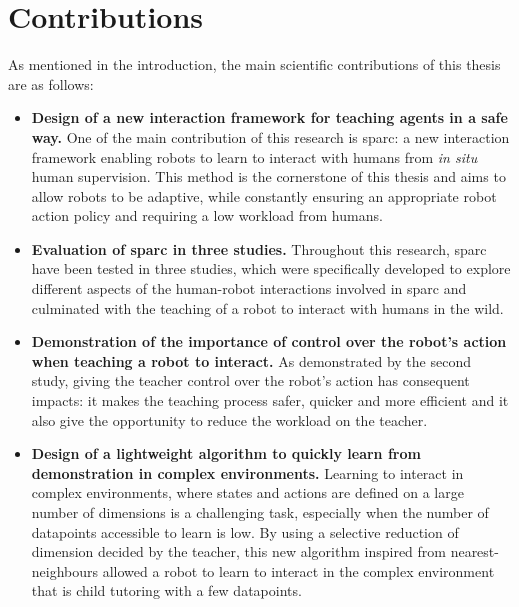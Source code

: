 \section{Contributions}\label{sec:conc_contribution}
As mentioned in the introduction, the main scientific contributions of this thesis are as follows:
\begin{itemize}
	\item \textbf{Design of a new interaction framework for teaching agents in a safe way.} One of the main contribution of this research is \gls{sparc}: a new interaction framework enabling robots to learn to interact with humans from \textit{in situ} human supervision. This method is the cornerstone of this thesis and aims to allow robots to be adaptive, while constantly ensuring an appropriate robot action policy and requiring a low workload from humans.
	
	\item \textbf{Evaluation of \gls{sparc} in three studies.} Throughout this research, \gls{sparc} have been tested in three studies, which were specifically developed to explore different aspects of the human-robot interactions involved in \gls{sparc} and culminated with the teaching of a robot to interact with humans in the wild.
	
	\item \textbf{Demonstration of the importance of control over the robot's action when teaching a robot to interact.} As demonstrated by the second study, giving the teacher control over the robot's action has consequent impacts: it makes the teaching process safer, quicker and more efficient and it also give the opportunity to reduce the workload on the teacher.
	
	\item \textbf{Design of a lightweight algorithm to quickly learn from demonstration in complex environments.} Learning to interact in complex environments, where states and actions are defined on a large number of dimensions is a challenging task, especially when the number of datapoints accessible to learn is low. By using a selective reduction of dimension decided by the teacher, this new algorithm inspired from nearest-neighbours allowed a robot to learn to interact in the complex environment that is child tutoring with a few datapoints. 
	

\end{itemize}
